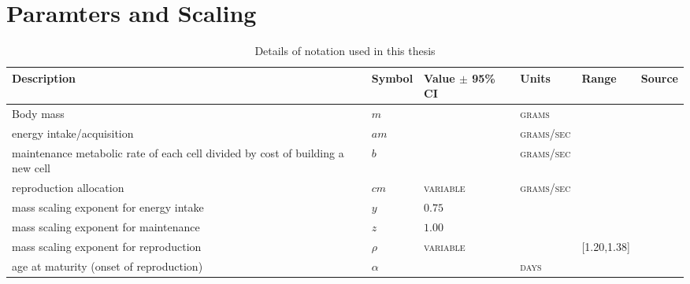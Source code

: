 \documentclass[a4paper]{article} %
\begin{document}
\section{Paramters and Scaling}
\begin{table}[H]
    \caption{Details of notation used in this thesis}
    \begin{tabularx}{\linewidth}{Xlllll}
    \hline
    \textbf{Description}                                                            & \textbf{Symbol}      & \textbf{Value $\pm$ 95\% CI}   & \textbf{Units}     & \textbf{Range}   & \textbf{Source}   \\ \hline
    Body mass                                                                       & $m$                  &                                & \textsc{grams}     &                  &                   \\ \hline
    energy intake/acquisition                                                       & $am$                 &                                & \textsc{grams/sec} &                  &                   \\ \hline
    maintenance metabolic rate of each cell divided by cost of building a new cell  & $b$                  &                                & \textsc{grams/sec} &                  &                   \\ \hline
    reproduction allocation                                                         & $cm$                 & \textsc{variable}              & \textsc{grams/sec} &                  &                   \\ \hline %
    mass scaling exponent for energy intake                                         & $y$                  & $0.75$                         & \textsc{}          &                  &                   \\ \hline
    mass scaling exponent for maintenance                                           & $z$                  & $1.00$                         & \textsc{}          &                  &                   \\ \hline
    mass scaling exponent for reproduction                                          & $\rho$               & \textsc{variable}              & \textsc{}          & [1.20,1.38]      &                   \\ \hline %
    age at maturity (onset of reproduction)                                         & $\alpha$             &                                & \textsc{days}      &                  &                   \\ \hline

\end{tabularx}
\end{table}
\end{document}
